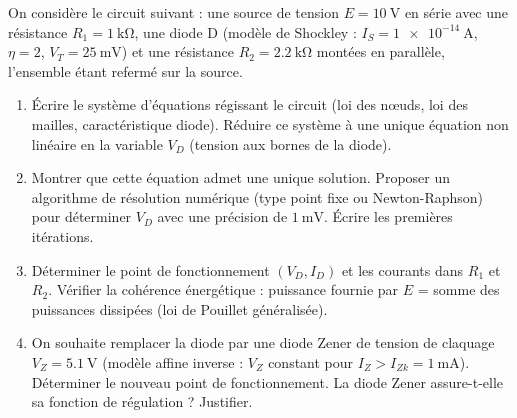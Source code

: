 \documentclass[11pt]{article}
\begin{document}
\begin{exercice}
On considère le circuit suivant : une source de tension $E = \SI{10}{\volt}$ en série avec une résistance $R_1 = \SI{1}{\kilo\ohm}$, une diode D (modèle de Shockley : $I_S = \SI{1e-14}{\ampere}$, $\eta = 2$, $V_T = \SI{25}{\milli\volt}$) et une résistance $R_2 = \SI{2,2}{\kilo\ohm}$ montées en parallèle, l'ensemble étant refermé sur la source.
\begin{enumerate}
    \item Écrire le système d'équations régissant le circuit (loi des nœuds, loi des mailles, caractéristique diode). Réduire ce système à une unique équation non linéaire en la variable $V_D$ (tension aux bornes de la diode).
    \item Montrer que cette équation admet une unique solution. Proposer un algorithme de résolution numérique (type point fixe ou Newton-Raphson) pour déterminer $V_D$ avec une précision de $\SI{1}{\milli\volt}$. Écrire les premières itérations.
    \item Déterminer le point de fonctionnement $(V_D, I_D)$ et les courants dans $R_1$ et $R_2$. Vérifier la cohérence énergétique : puissance fournie par $E$ = somme des puissances dissipées (loi de Pouillet généralisée).
    \item On souhaite remplacer la diode par une diode Zener de tension de claquage $V_Z = \SI{5,1}{\volt}$ (modèle affine inverse : $V_Z$ constant pour $I_Z > I_{Zk} = \SI{1}{\milli\ampere}$). Déterminer le nouveau point de fonctionnement. La diode Zener assure-t-elle sa fonction de régulation ? Justifier.
\end{enumerate}
\end{exercice}
\end{document}
